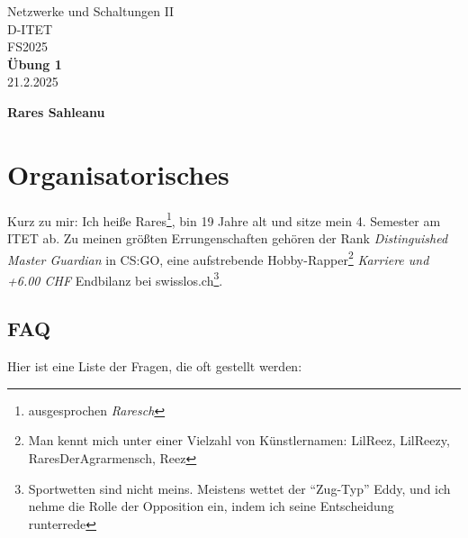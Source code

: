 \documentclass[11pt,a4paper]{article}
\title{}
\date{}  %
\begin{document}
\begin{titlepage}
    \centering
    
    {\Huge Netzwerke und Schaltungen II}\\[0.8cm]
    {\Large D-ITET}\\[0.8cm]
    {\Large FS2025}\\[3.5cm]
    
    {\Huge \textbf{Übung 1}}\\[1cm]
    {\Large 21.2.2025}\\[3.5cm]


    \vfill
    {\Large \textbf{Rares Sahleanu}}
\end{titlepage}


\newpage
\pagestyle{fancy}  


\fancyfoot[L]{}  
\fancyfoot[C]{\thepage}
\fancyfoot[R]{}

\renewcommand{\headrulewidth}{0.4pt}  
\renewcommand{\footrulewidth}{0pt}  

\section{Organisatorisches}
Kurz zu mir: Ich heiße Rares\footnote{ausgesprochen \textit{Raresch} \textipa{['ra:r\esh]}}, bin 19 Jahre alt und sitze mein 4. Semester am ITET ab. Zu meinen größten Errungenschaften gehören der Rank \textit{Distinguished Master Guardian} in CS:GO, eine aufstrebende Hobby-Rapper\footnote{Man kennt mich unter einer Vielzahl von Künstlernamen: LilReez, LilReezy, RaresDerAgrarmensch, Reez} \textit{Karriere und +6.00 CHF} Endbilanz bei swisslos.ch\footnote{Sportwetten sind nicht meins. Meistens wettet der ``Zug-Typ'' Eddy, und ich nehme die Rolle der Opposition ein, indem ich seine Entscheidung runterrede}. 

\subsection{FAQ}
Hier ist eine Liste der Fragen, die oft gestellt werden:
\end{document}
